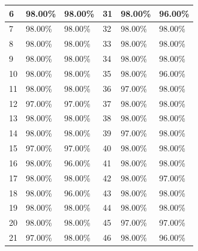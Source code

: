 \begin{table}[H]
\begin{tabular}{|l|l|l|l|l|l|}
			6  & 98.00\%                 & 98.00\%                    & 31  & 98.00\%                 & 96.00\%                  \\ \hline
			7  & 98.00\%                 & 98.00\%                    & 32  & 98.00\%                 & 98.00\%                  \\ \hline
			8  & 98.00\%                 & 98.00\%                    & 33  & 98.00\%                 & 98.00\%                  \\ \hline
			9  & 98.00\%                 & 98.00\%                    & 34  & 98.00\%                 & 98.00\%                  \\ \hline
			10 & 98.00\%                 & 98.00\%                    & 35  & 98.00\%                 & 96.00\%                  \\ \hline
			11 & 98.00\%                 & 98.00\%                    & 36  & 97.00\%                 & 98.00\%                  \\ \hline
			12 & 97.00\%                 & 97.00\%                    & 37  & 98.00\%                 & 98.00\%                  \\ \hline
			13 & 98.00\%                 & 98.00\%                    & 38  & 98.00\%                 & 98.00\%                  \\ \hline
			14 & 98.00\%                 & 98.00\%                    & 39  & 97.00\%                 & 98.00\%                  \\ \hline
			15 & 97.00\%                 & 97.00\%                    & 40  & 98.00\%                 & 98.00\%                  \\ \hline
			16 & 98.00\%                 & 96.00\%                    & 41  & 98.00\%                 & 98.00\%                  \\ \hline
			17 & 98.00\%                 & 98.00\%                    & 42  & 98.00\%                 & 97.00\%                  \\ \hline
			18 & 98.00\%                 & 96.00\%                    & 43  & 98.00\%                 & 98.00\%                  \\ \hline
			19 & 98.00\%                 & 98.00\%                    & 44  & 98.00\%                 & 98.00\%                  \\ \hline
			20 & 98.00\%                 & 98.00\%                    & 45  & 97.00\%                 & 97.00\%                  \\ \hline
			21 & 97.00\%                 & 98.00\%                    & 46  & 98.00\%                 & 96.00\%                  \\ \hline

\end{tabular}
\end{table}
